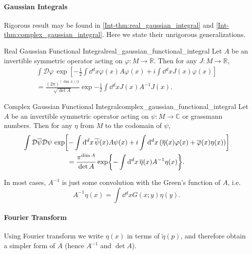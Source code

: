 \documentclass{article}
\begin{document}
\paragraph*{Gaussian Integrals}
Rigorous result may be found in \cref{Int-thm:real_gaussian_integral} and \cref{Int-thm:complex_gaussian_integral}.
Here we state their unrigorous generalizations.

\begin{theorem}{Real Gaussian Functional Integral}{real_gaussian_functional_integral}
Let $A$ be an invertible symmetric operator acting on $\varphi: M\rightarrow \mathbb{R}$.
Then for any $J: M\rightarrow \mathbb{R}$,
\begin{gather*}
    \int \mathcal{D}\varphi\, \exp[-\frac{1}{2}\int \dd{^d x} \varphi(x) A\varphi(x) + i \int \dd{^d x} J(x)\varphi(x)] \\
    = \frac{(2\pi)^{(\dim A)/2}}{\sqrt{\det A}} \exp{-\frac{1}{2}\int \dd{^d x} J(x) A^{-1}J(x)}.
\end{gather*}
\end{theorem}

\begin{theorem}{Complex Gaussian Functional Integral}{complex_gaussian_functional_integral}
Let $A$ be an invertible symmetric operator acting on $\psi: M\rightarrow \mathbb{C}$ or grassmann numbers.
Then for any $\eta$ from $M$ to the codomain of $\psi$,
\begin{gather*}
    \int \mathcal{D}\overline{\psi}\mathcal{D}\psi\, \exp[-\int \dd{^d x} \overline{\psi}(x) A\psi(x) + i \int \dd{^d x} \qty(\overline{\eta}(x)\varphi(x) + \overline{\varphi}(x)\eta(x))] \\
    = \frac{\pi^{\dim A}}{\det A} \exp{-\int \dd{^d x} \overline{\eta}(x) A^{-1}\eta(x)}.
\end{gather*}
\end{theorem}

In most cases, $A^{-1}$ is just some convolution with the Green's function of $A$, i.e.
\[ A^{-1}\eta(x) = \int \dd{^d x} G(x;y) \eta(y). \]

\paragraph*{Fourier Transform}
Using Fourier transform we write $\eta(x)$ in terms of $\tilde{\eta}(p)$, and therefore obtain a simpler form of $A$ (hence $A^{-1}$ and $\det A$).
\end{document}
